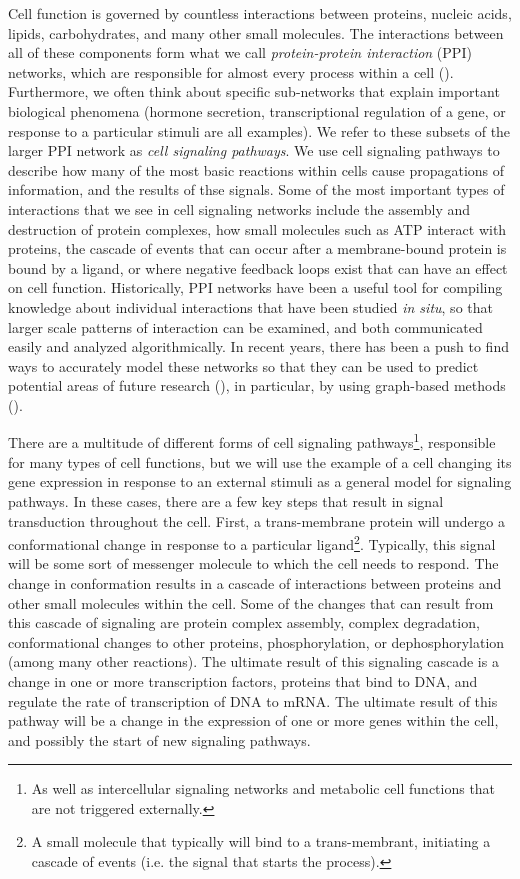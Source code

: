 \documentclass[12pt,twoside]{reedthesis}
\theoremstyle{definition}
\begin{document}
Cell function is governed by countless interactions between proteins, nucleic acids, lipids, carbohydrates, and many other small molecules.  The interactions between all of these components form what we call \textit{protein-protein interaction} (PPI) networks, which are responsible for almost every process within a cell (\cite{Taylor2009}). Furthermore, we often think about specific sub-networks that explain important biological phenomena (hormone secretion, transcriptional regulation of a gene, or response to a particular stimuli are all examples). We refer to these subsets of the larger PPI network as \textit{cell signaling pathways}. We use cell signaling pathways to describe how many of the most basic reactions within cells cause propagations of information, and the results of thse signals.  Some of the most important types of interactions that we see in cell signaling networks include the assembly and destruction of protein complexes, how small molecules such as ATP interact with proteins, the cascade of events that can occur after a membrane-bound protein is bound by a ligand, or where negative feedback loops exist that can have an effect on cell function.  Historically, PPI networks have been a useful tool for compiling knowledge about individual interactions that have been studied \textit{in situ}, so that larger scale patterns of interaction can be examined, and both communicated easily and analyzed algorithmically. In recent years, there has been a push to find ways to accurately model these networks so that they can be used to predict potential areas of future research (\cite{Haverty2004}), in particular, by using graph-based methods (\cite{Aittokallio2006}).\par

There are a multitude of different forms of cell signaling pathways\footnote{As well as intercellular signaling networks and metabolic cell functions that are not triggered externally.}, responsible for many types of cell functions, but we will use the example of a cell changing its gene expression in response to an external stimuli as a general model for signaling pathways. In these cases, there are a few key steps that result in signal transduction throughout the cell. First, a trans-membrane protein will undergo a conformational change in response to a particular ligand\footnote{A small molecule that typically will bind to a trans-membrant, initiating a cascade of events (i.e. the signal that starts the process).}. Typically, this signal will be some sort of messenger molecule to which the cell needs to respond. The change in conformation results in a cascade of interactions between proteins and other small molecules within the cell. Some of the changes that can result from this cascade of signaling are protein complex assembly, complex degradation, conformational changes to other proteins, phosphorylation, or dephosphorylation (among many other reactions). The ultimate result of this signaling cascade is a change in one or more transcription factors, proteins that bind to DNA, and regulate the rate of transcription of DNA to mRNA. The ultimate result of this pathway will be a change in the expression of one or more genes within the cell, and possibly the start of new signaling pathways.\par
\end{document}

